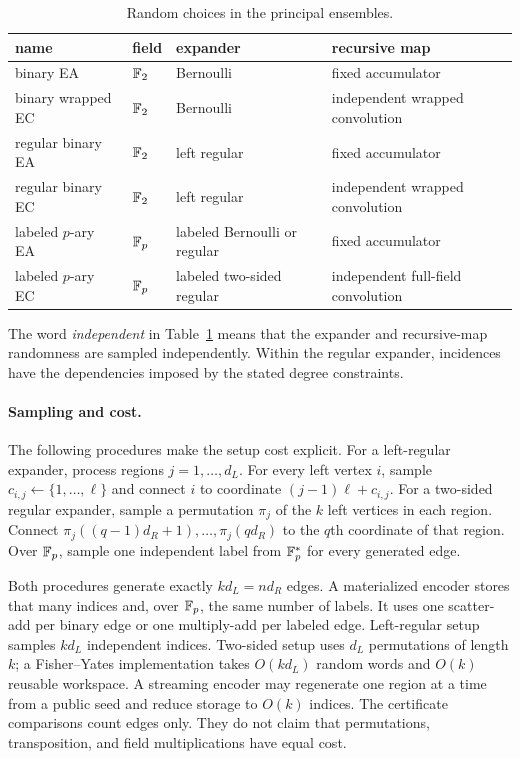 \begin{table}[t]
\centering
\small
\caption{Random choices in the principal ensembles.}
\label{tab:ensemble-definitions}
\begin{tabular}{@{}llll@{}}
\toprule
name & field & expander & recursive map \\
\midrule
binary EA & $\mathbb F_2$ & Bernoulli & fixed accumulator \\
binary wrapped EC & $\mathbb F_2$ & Bernoulli & independent wrapped convolution \\
regular binary EA & $\mathbb F_2$ & left regular & fixed accumulator \\
regular binary EC & $\mathbb F_2$ & left regular & independent wrapped convolution \\
labeled $p$-ary EA & $\mathbb F_p$ & labeled Bernoulli or regular & fixed accumulator \\
labeled $p$-ary EC & $\mathbb F_p$ & labeled two-sided regular & independent full-field convolution \\
\bottomrule
\end{tabular}
\end{table}

The word \emph{independent} in Table~\ref{tab:ensemble-definitions} means that
the expander and recursive-map randomness are sampled independently.  Within
the regular expander, incidences have the dependencies imposed by the stated
degree constraints.

\paragraph{Sampling and cost.}
The following procedures make the setup cost explicit.  For a left-regular
expander, process regions $j=1,\ldots,d_L$.  For every left vertex $i$, sample
$c_{i,j}\gets\{1,\ldots,\ell\}$ and connect $i$ to coordinate
$(j-1)\ell+c_{i,j}$.  For a two-sided regular expander, sample a permutation
$\pi_j$ of the $k$ left vertices in each region.  Connect
$\pi_j((q-1)d_R+1),\ldots,\pi_j(qd_R)$ to the $q$th coordinate of that region.
Over $\mathbb F_p$, sample one independent label from $\mathbb F_p^*$ for every generated
edge.

Both procedures generate exactly $kd_L=nd_R$ edges.  A materialized encoder
stores that many indices and, over $\mathbb F_p$, the same number of labels.  It uses
one scatter-add per binary edge or one multiply-add per labeled edge.
Left-regular setup samples $kd_L$ independent indices.  Two-sided setup uses
$d_L$ permutations of length $k$; a Fisher--Yates implementation takes
$O(kd_L)$ random words and $O(k)$ reusable workspace.  A streaming encoder
may regenerate one region at a time from a public seed and reduce storage to
$O(k)$ indices.  The certificate comparisons count edges only.  They do not
claim that permutations, transposition, and field multiplications have equal
cost.
